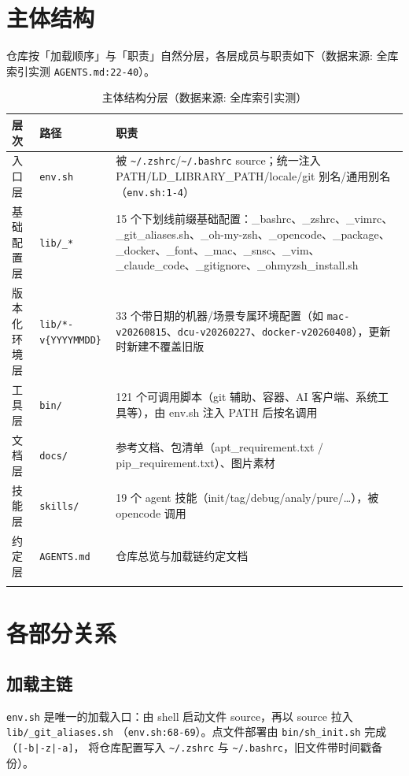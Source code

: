 \documentclass[UTF8]{ctexart}
\begin{document}
\section{主体结构}
仓库按「加载顺序」与「职责」自然分层，各层成员与职责如下（数据来源: 全库索引实测
\texttt{\nolinkurl{AGENTS.md:22-40}}）。

\begin{xltabular}{\textwidth}{llX}
\toprule
\textcolor{struct}{层次} & 路径 & \textcolor{struct}{职责} \\
\midrule
\endhead
入口层 & \texttt{env.sh} & 被 \texttt{\textasciitilde/.zshrc}/\texttt{\textasciitilde/.bashrc} source；统一注入 PATH/LD\_LIBRARY\_PATH/locale/git 别名/通用别名（\texttt{\nolinkurl{env.sh:1-4}}） \\
基础配置层 & \texttt{lib/\_*} & 15 个下划线前缀基础配置：\_bashrc、\_zshrc、\_vimrc、\_git\_aliases.sh、\_oh-my-zsh、\_opencode、\_package、\_docker、\_font、\_mac、\_snsc、\_vim、\_claude\_code、\_gitignore、\_ohmyzsh\_install.sh \\
版本化环境层 & \texttt{lib/*-v\{YYYYMMDD\}} & 33 个带日期的机器/场景专属环境配置（如 \texttt{mac-v20260815}、\texttt{dcu-v20260227}、\texttt{docker-v20260408}），更新时新建不覆盖旧版 \\
工具层 & \texttt{bin/} & 121 个可调用脚本（git 辅助、容器、AI 客户端、系统工具等），由 env.sh 注入 PATH 后按名调用 \\
文档层 & \texttt{docs/} & 参考文档、包清单（apt\_requirement.txt / pip\_requirement.txt）、图片素材 \\
技能层 & \texttt{skills/} & 19 个 agent 技能（init/tag/debug/analy/pure/\ldots），被 opencode 调用 \\
约定层 & \texttt{AGENTS.md} & 仓库总览与加载链约定文档 \\
\bottomrule
\caption{主体结构分层（数据来源: 全库索引实测）}
\end{xltabular}

\section{各部分关系}
\subsection{加载主链}
\texttt{env.sh} 是唯一的加载入口：由 shell 启动文件 source，再以 source 拉入 \texttt{lib/\_git\_aliases.sh}
（\texttt{\nolinkurl{env.sh:68-69}}）。点文件部署由 \texttt{bin/sh\_init.sh} 完成（\texttt{[-b|-z|-a]}，
将仓库配置写入 \texttt{\textasciitilde/.zshrc} 与 \texttt{\textasciitilde/.bashrc}，旧文件带时间戳备份）。
\end{document}

